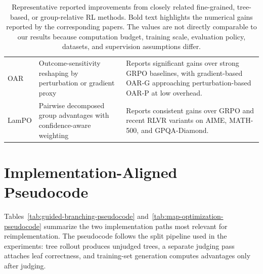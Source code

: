 \documentclass{article}
\begin{document}
\begin{table}[t]
{\begin{tabular}{p{}p{}p{}}
OAR \cite{oar2026} & Outcome-sensitivity reshaping by perturbation or gradient proxy & Reports significant gains over strong GRPO baselines, with gradient-based OAR-G approaching perturbation-based OAR-P at low overhead. \\
LamPO \cite{lampo2026} & Pairwise decomposed group advantages with confidence-aware weighting & Reports consistent gains over GRPO and recent RLVR variants on AIME, MATH-500, and GPQA-Diamond. \\
\hline
\end{tabular}
}
\caption{Representative reported improvements from closely related fine-grained, tree-based, or group-relative RL methods. Bold text highlights the numerical gains reported by the corresponding papers. The values are not directly comparable to our results because computation budget, training scale, evaluation policy, datasets, and supervision assumptions differ.}
\label{tab:related-reported-results}
\end{table}

\section{Implementation-Aligned Pseudocode}
\label{app:pseudocode}
Tables~\ref{tab:guided-branching-pseudocode} and~\ref{tab:map-optimization-pseudocode} summarize the two implementation paths most relevant for reimplementation. The pseudocode follows the split pipeline used in the experiments: tree rollout produces unjudged trees, a separate judging pass attaches leaf correctness, and training-set generation computes advantages only after judging.
\end{document}
